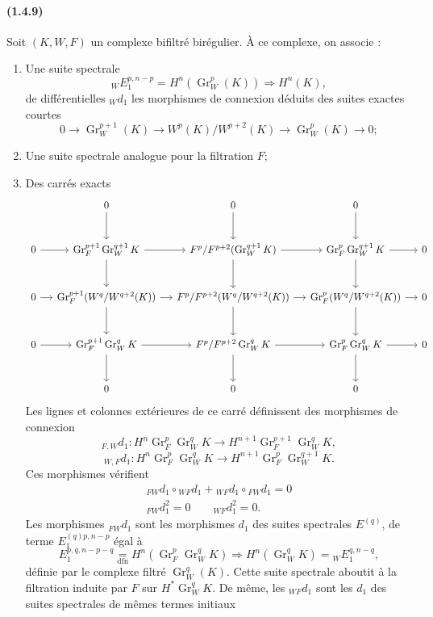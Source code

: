 \documentclass[10pt]{article}
\newcommand{\Gr}{\operatorname{Gr}}
\begin{document}
\paragraph{(1.4.9)} Soit $(K,W,F)$ un complexe bifiltré birégulier. À ce complexe, on associe :
\begin{enumerate}[label=\alph*)]
\item Une suite spectrale
\[
{}_WE_1^{p,n-p}=H^n(\Gr_W^p(K))\Rightarrow H^n(K),
\]
de différentielles ${}_Wd_1$ les morphismes de connexion déduits des suites exactes courtes
\[
0\to\Gr_W^{p+1}(K)\to W^p(K)/W^{p+2}(K)\to\Gr_W^p(K)\to0;
\]
\item Une suite spectrale analogue pour la filtration $F$;
\item Des carrés exacts
\[
\begin{tikzcd}[column sep=small,row sep=large]
& 0 \arrow[d] & 0 \arrow[d] & 0 \arrow[d] & \\
0 \arrow[r] & \Gr_F^{p+1}\Gr_W^{q+1}K \arrow[r] \arrow[d] & F^p/F^{p+2}(\Gr_W^{q+1}K) \arrow[r] \arrow[d] & \Gr_F^{p}\Gr_W^{q+1}K \arrow[r] \arrow[d] & 0\\
0 \arrow[r] & \Gr_F^{p+1}(W^q/W^{q+2}(K)) \arrow[r] \arrow[d] & F^p/F^{p+2}(W^q/W^{q+2}(K)) \arrow[r] \arrow[d] & \Gr_F^{p}(W^q/W^{q+2}(K)) \arrow[r] \arrow[d] & 0\\
0 \arrow[r] & \Gr_F^{p+1}\Gr_W^{q}K \arrow[r] \arrow[d] & F^p/F^{p+2}\Gr_W^{q}K \arrow[r] \arrow[d] & \Gr_F^{p}\Gr_W^{q}K \arrow[r] \arrow[d] & 0\\
& 0 & 0 & 0
\end{tikzcd}
\]
Les lignes et colonnes extérieures de ce carré définissent des morphismes de connexion
\[
{}_{F,W}d_1:H^n\Gr_F^p\Gr_W^qK\longrightarrow H^{n+1}\Gr_F^{p+1}\Gr_W^qK,
\]
\[
{}_{W,F}d_1:H^n\Gr_F^p\Gr_W^qK\longrightarrow H^{n+1}\Gr_F^p\Gr_W^{q+1}K.
\]
Ces morphismes vérifient
\[
\begin{gathered}
{}_{FW}d_1\circ{}_{WF}d_1+{}_{WF}d_1\circ{}_{FW}d_1=0\\
{}_{FW}d_1^2=0\qquad {}_{WF}d_1^2=0.
\end{gathered}
\]
Les morphismes ${}_{FW}d_1$ sont les morphismes $d_1$ des suites spectrales $E^{(q)}$, de terme $E_1^{(q)p,n-p}$ égal à
\[
\tag{1.4.9.1}
E_1^{p,q,n-p-q}\underset{\mathrm{dfn}}{=}H^n(\Gr_F^p\Gr_W^qK)\Rightarrow H^n(\Gr_W^qK)={}_WE_1^{q,n-q},
\]
définie par le complexe filtré $\Gr_W^q(K)$. Cette suite spectrale aboutit à la filtration induite par $F$ sur $H^*\Gr_W^qK$. De même, les ${}_{WF}d_1$ sont les $d_1$ des suites spectrales de mêmes termes initiaux
\[
\tag{1.4.9.2}
\]
\end{enumerate}
\end{document}
